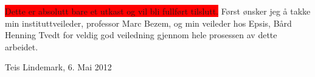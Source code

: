 \colorbox{red}{Dette er absolutt bare et utkast og vil bli fullført tilslutt.}
Først ønsker jeg å takke min instituttveileder, professor Marc Bezem, og min veileder hos Epsis, Bård Henning Tvedt for veldig god veiledning gjennom hele prosessen av dette arbeidet.

Teis Lindemark, 6. Mai 2012